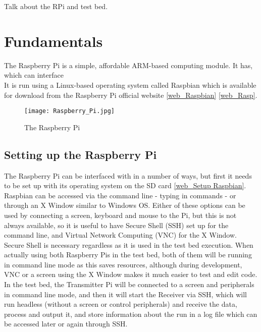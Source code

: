 \documentclass[../main.tex]{subfiles}
\begin{document}
Talk about the RPi and test bed.


\section{Fundamentals}

The Raspberry Pi is a simple, affordable ARM-based computing module. It has, which can interface\\

It is run using a Linux-based operating system called Raspbian which is available for download from the Raspberry Pi official website \ref{web_Raspbian} \ref{web_Rasp}.\\


\begin{figure}[ht]
	\centering
	\texttt{[image: Raspberry\_Pi.jpg]}
	\caption{The Raspberry Pi}
\end{figure}

\subsection{Setting up the Raspberry Pi}

The Raspberry Pi can be interfaced with in a number of ways, but first it needs to be set up with its operating system on the SD card \ref{web_Setup Raspbian}.
Raspbian can be accessed via the command line - typing in commands - or through an X Window similar to Windows OS.
Either of these options can be used by connecting a screen, keyboard and mouse to the Pi, but this is not always available, so it is useful to have Secure Shell (SSH) set up for the command line, and Virtual Network Computing (VNC) for the X Window.
Secure Shell is necessary regardless as it is used in the test bed execution.
When actually using both Raspberry Pis in the test bed, both of them will be running in command line mode as this saves resources, although during development, VNC or a screen using the X Window makes it much easier to test and edit code.
In the test bed, the Transmitter Pi will be connected to a screen and peripherals in command line mode, and then it will start the Receiver via SSH, which will run headless (without a screen or control peripherals) and receive the data, process and output it, and store information about the run in a log file which can be accessed later or again through SSH.\\
\end{document}
